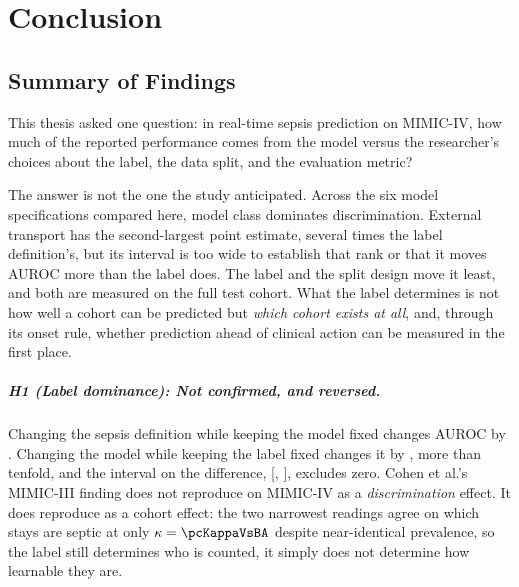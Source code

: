 \chapter{Conclusion}
\label{ch:conclusion}


\section{Summary of Findings}

This thesis asked one question: in real-time sepsis prediction on MIMIC-IV, how
much of the reported performance comes from the model versus the researcher's
choices about the label, the data split, and the evaluation metric?

The answer is not the one the study anticipated. Across the six model
specifications compared here, model class dominates discrimination. External transport has the second-largest point estimate,
several times the label definition's, but its interval is too wide to establish
that rank or that it moves AUROC more than the label does. The label and the
split design move it least, and both are measured on the full test cohort. What the label determines is
not how well a cohort can be predicted but \emph{which cohort exists at all},
and, through its onset rule, whether prediction ahead of clinical action can be
measured in the first place.

\paragraph{H1 (Label dominance): Not confirmed, and reversed.}
Changing the sepsis definition while keeping the model fixed changes AUROC by
\pcSpreadLabel. Changing the model while keeping the label fixed changes it by
\pcSpreadModelClass{}, more than tenfold, and the interval on the
difference, [\pcHOneCiLo, \pcHOneCiHi], excludes zero. Cohen et al.'s
\cite{cohen2024subtle} MIMIC-III finding does not reproduce on MIMIC-IV as a
\emph{discrimination} effect. It does reproduce as a cohort effect: the two
narrowest readings agree on which stays are septic at only
$\kappa = \pcKappaVsBA$ despite near-identical prevalence, so the label still
determines who is counted, it simply does not determine how learnable they
are.

